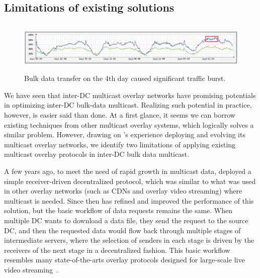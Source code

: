 \subsection{Limitations of existing solutions}
\label{subsec:motivation:baseline}

\begin{figure}[t]
        \center
        \includegraphics[height=25mm,width=150mm]{images/nj02-M2A_0212-0216.eps}
        \caption{Bulk data transfer on the 4th day caused significant traffic burst.
        }
        \label{fig:lesson2}
\end{figure}

We have seen that inter-DC multicast overlay networks have
promising potentials in optimizing inter-DC bulk-data multicast.
Realizing such potential in practice, however,
is easier said than done.
At a first glance, it seems we can borrow existing techniques
from other multicast overlay systems, which logically solves a
similar problem.
However, drawing on \company's experience deploying and evolving
its multicast overlay networks, we identify two limitations of
applying existing multicast overlay protocols in inter-DC bulk
data multicast.

A few years ago, to meet the need of rapid growth in multicast
data, \company deployed a simple
receiver-driven decentralized protocol, which
was similar to what was used in other overlay networks
(such as CDNs and overlay video streaming)
where multicast is needed.
Since then \company has refined and improved the performance of 
this solution, but the basic workflow of
data requests remains the same.
When multiple DC wants to download a data
file, they send the request to the source DC, and then the
requested data would flow back through multiple stages of
intermediate servers, where the selection of senders in each stage
is driven by the receivers of the next stage in a decentralized
fashion.
This basic workflow resembles many state-of-the-arts overlay
protocols designed for large-scale live video
streaming~\cite{Andreev2013Designing,sripanidkulchai2004analysis,zhang2005coolstreaming}.

